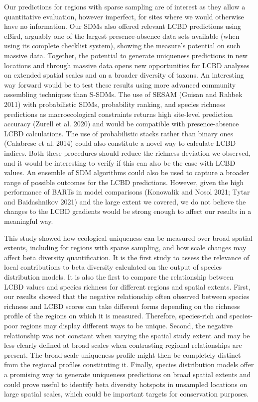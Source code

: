 \documentclass[10pt,oneside]{article}
\begin{document}
Our predictions for regions with sparse sampling are of interest as they
allow a quantitative evaluation, however imperfect, for sites where we
would otherwise have no information. Our SDMs also offered relevant LCBD
predictions using eBird, arguably one of the largest presence-absence
data sets available (when using its complete checklist system), showing
the measure's potential on such massive data. Together, the potential to
generate uniqueness predictions in new locations and through massive
data opens new opportunities for LCBD analyses on extended spatial
scales and on a broader diversity of taxons. An interesting way forward
would be to test these results using more advanced community assembling
techniques than S-SDMs. The use of SESAM (Guisan and Rahbek 2011) with
probabilistic SDMs, probability ranking, and species richness
predictions as macroecological constraints returns high site-level
prediction accuracy (Zurell et al. 2020) and would be compatible with
presence-absence LCBD calculations. The use of probabilistic stacks
rather than binary ones (Calabrese et al. 2014) could also constitute a
novel way to calculate LCBD indices. Both these procedures should reduce
the richness deviation we observed, and it would be interesting to
verify if this can also be the case with LCBD values. An ensemble of SDM
algorithms could also be used to capture a broader range of possible
outcomes for the LCBD predictions. However, given the high performance
of BARTs in model comparisons (Konowalik and Nosol 2021; Tytar and
Baidashnikov 2021) and the large extent we covered, we do not believe
the changes to the LCBD gradients would be strong enough to affect our
results in a meaningful way.

This study showed how ecological uniqueness can be measured over broad
spatial extents, including for regions with sparse sampling, and how
scale changes may affect beta diversity quantification. It is the first
study to assess the relevance of local contributions to beta diversity
calculated on the output of species distribution models. It is also the
first to compare the relationship between LCBD values and species
richness for different regions and spatial extents. First, our results
showed that the negative relationship often observed between species
richness and LCBD scores can take different forms depending on the
richness profile of the regions on which it is measured. Therefore,
species-rich and species-poor regions may display different ways to be
unique. Second, the negative relationship was not constant when varying
the spatial study extent and may be less clearly defined at broad scales
when contrasting regional relationships are present. The broad-scale
uniqueness profile might then be completely distinct from the regional
profiles constituting it. Finally, species distribution models offer a
promising way to generate uniqueness predictions on broad spatial
extents and could prove useful to identify beta diversity hotspots in
unsampled locations on large spatial scales, which could be important
targets for conservation purposes.
\end{document}
